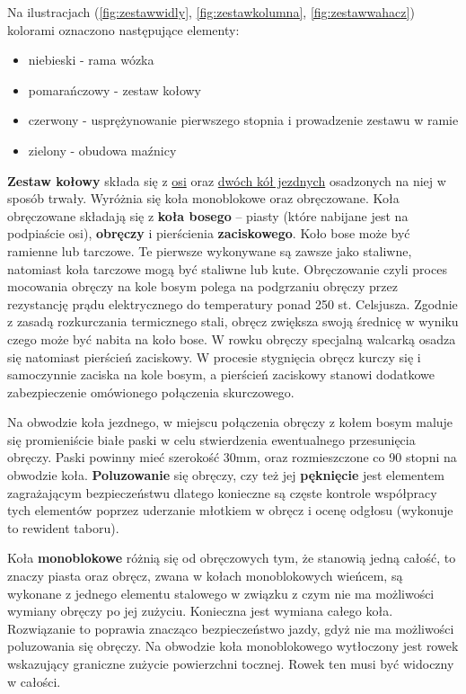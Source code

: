 Na ilustracjach (\ref{fig:zestawwidly}, \ref{fig:zestawkolumna}, \ref{fig:zestawwahacz}) kolorami oznaczono następujące elementy: 
\begin{itemize}
	\item niebieski - rama wózka
	\item pomarańczowy - zestaw kołowy
	\item czerwony - usprężynowanie pierwszego stopnia i prowadzenie zestawu w ramie
	\item zielony - obudowa maźnicy
\end{itemize}
\textbf{Zestaw kołowy} składa się z \underline{osi} oraz \underline{dwóch kół jezdnych} osadzonych na niej w sposób trwały.
Wyróżnia się koła monoblokowe oraz obręczowane. 
Koła obręczowane składają się z \textbf{koła bosego} – piasty (które nabijane jest na podpiaście osi), \textbf{obręczy} i pierścienia \textbf{zaciskowego}. Koło bose może być ramienne lub tarczowe. Te pierwsze wykonywane są zawsze jako staliwne, natomiast koła tarczowe mogą być staliwne lub kute. 
Obręczowanie czyli proces mocowania obręczy na kole bosym polega na podgrzaniu obręczy przez rezystancję prądu elektrycznego do temperatury ponad 250 st. Celsjusza. Zgodnie z zasadą rozkurczania termicznego stali, obręcz zwiększa swoją średnicę w wyniku czego może być nabita na koło bose. W rowku obręczy specjalną walcarką osadza się natomiast pierścień zaciskowy. W procesie stygnięcia obręcz kurczy się i samoczynnie zaciska na kole bosym, a pierścień zaciskowy stanowi dodatkowe zabezpieczenie omówionego połączenia skurczowego.

Na obwodzie koła jezdnego, w miejscu połączenia obręczy z kołem bosym maluje się promieniście białe paski w celu stwierdzenia ewentualnego przesunięcia obręczy. Paski powinny mieć szerokość 30mm, oraz rozmieszczone co 90 stopni na obwodzie koła. \textbf{Poluzowanie} się obręczy, czy też jej \textbf{pęknięcie} jest elementem zagrażającym bezpieczeństwu dlatego konieczne są częste kontrole współpracy tych elementów poprzez uderzanie młotkiem w obręcz i ocenę odgłosu (wykonuje to rewident taboru). 

Koła \textbf{monoblokowe} różnią się od obręczowych tym, że stanowią jedną całość, to znaczy piasta oraz obręcz, zwana w kołach monoblokowych wieńcem, są wykonane z jednego elementu stalowego w związku z czym nie ma możliwości wymiany obręczy po jej zużyciu. Konieczna jest wymiana całego koła. Rozwiązanie to poprawia znacząco bezpieczeństwo jazdy, gdyż nie ma możliwości poluzowania się obręczy. Na obwodzie koła monoblokowego wytłoczony jest rowek wskazujący graniczne zużycie powierzchni tocznej. Rowek ten musi być widoczny w całości.

